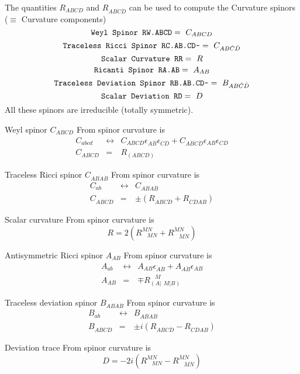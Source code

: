 \documentclass[twoside,openright]{report}
\newcommand{\grgtt}{\ttfamily}
\newcommand{\object}[2]{%
\begin{equation}
\mbox{\comm{#1}} =\ #2
\end{equation}}
\newcommand{\tsst}{\longleftrightarrow}
\renewcommand{\tt}{\grgtt}
\newcommand{\cc}{{\tt \char'176}}           %
\newcommand{\comm}[1]{{\upshape\tt#1}}    %
\begin{document}
The quantities $R_{ABCD}$ and $R_{AB\dot C\dot D}$ can be used to compute
the {\tt Curvature spinors} ($\equiv$ {\tt Curvature components})
\object{Weyl Spinor                 RW.ABCD}{C_{ABCD}}
\object{Traceless Ricci Spinor      RC.AB.CD\cc}{C_{AB\dot C\dot D}}
\object{Scalar Curvature                      RR}{R}
\object{Ricanti Spinor              RA.AB}{A_{AB}}
\object{Traceless Deviation Spinor  RB.AB.CD\cc}{B_{AB\dot C\dot D}}
\object{Scalar Deviation            RD}{D}
All these spinors are irreducible (totally symmetric).

Weyl spinor $C_{ABCD}$ {\tt From spinor curvature} is
\begin{eqnarray}
C_{abcd}&\tsst& C_{ABCD}\epsilon_{\dot{A}\dot{B}}\epsilon_{\dot{C}\dot{D}}
             +C_{\dot{A}\dot{B}\dot{C}\dot{D}}\epsilon_{AB}\epsilon_{CD} \\[1mm]
C_{ABCD}&=&R_{(ABCD)} \label{RW}
\end{eqnarray}

Traceless Ricci spinor $C_{AB\dot{A}\dot{B}}$ {\tt From spinor curvature} is
\begin{eqnarray}
C_{ab}&\tsst&C_{AB\dot{A}\dot{B}}\\[2mm]
C_{AB\dot{C}\dot{D}}&=&\pm(R_{AB\dot{C}\dot{D}}+R_{\dot{C}\dot{D} AB})
\end{eqnarray}

Scalar curvature {\tt From spinor curvature} is
\begin{equation} R=2(R^{MN}_{\ \ \ \ MN}+R^{\dot{M}\dot{N}}_{\ \ \ \ \dot{M}\dot{N}})
\end{equation}

Antisymmetric Ricci spinor $A_{AB}$ {\tt From spinor curvature} is
\begin{eqnarray}
A_{ab}&\tsst& A_{AB}\epsilon_{\dot{A}\dot{B}}+A_{\dot{A}\dot{B}}\epsilon_{AB}\\[1mm]
A_{AB}&=&\mp R^{\ \ \ \,M}_{(A|\ \ M|B)}
\end{eqnarray}

Traceless deviation spinor $B_{AB\dot{A}\dot{B}}$ {\tt From spinor curvature} is
\begin{eqnarray}
B_{ab}&\tsst&B_{AB\dot{A}\dot{B}}\\[1mm]
B_{AB\dot{C}\dot{D}}&=&\pm i(R_{AB\dot{C}\dot{D}}-R_{\dot{C}\dot{D} AB})
\end{eqnarray}

Deviation trace {\tt From spinor curvature} is
\begin{equation}
D=-2i(R^{MN}_{\ \ \ \  MN}-R^{\dot{M}\dot{N}}_{\ \ \ \ \dot{M}\dot{N}})
\end{equation}
\end{document}
